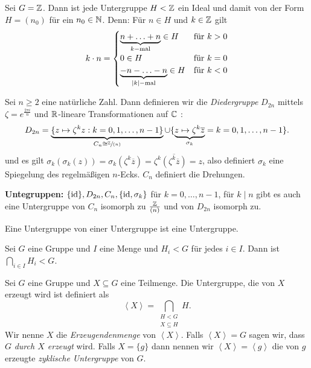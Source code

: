 \begin{eg}
	Sei $G = \mathbb{Z}$. Dann ist jede Untergruppe $H < \mathbb{Z}$ ein Ideal und damit von der Form $H = (n_0)$ für ein $n_0 \in \mathbb{N}$.
	Denn: Für $n \in H$ und $k \in \mathbb{Z}$ gilt 
	\[
		k \cdot n = \begin{cases}
			\underbrace{n + \ldots + n}_{k-\text{mal}} \in H &\text{für } k > 0\\
			0 \in H &\text{für } k = 0\\
			\underbrace{-n - \ldots -n}_{\abs{k}-\text{mal}} \in H &\text{für } k <0
		\end{cases}
	\]
\end{eg}

\begin{eg}
	Sei $n \geq 2$ eine natürliche Zahl.
	Dann definieren wir die \emph{Diedergruppe} $D_{2n}$ mittels $\zeta = e^{\frac{2 \pi i}{n}}$ und $\mathbb{R}$-lineare Transformationen auf $\mathbb{C}$ :
	\[
		D_{2n} = \underbrace{\{z \mapsto \zeta^{k} z : k = 0,1,\ldots,n-1\}}_{C_{n} \cong \sfrac{\mathbb{Z}}{(n)}} \cup 
		\{\underbrace{z \mapsto \zeta^{k} \overline{z}}_{\sigma_{k}} = k = 0,1,\ldots,n-1\} 
	.\] 
	und es gilt $\sigma_{k}(\sigma_{k}(z)) = \sigma_{k}(\zeta^{k} \overline{z}) = \zeta^{k} \overline{(\zeta^{k} \overline{z})} = z$, also definiert $\sigma_{k}$ eine Spiegelung 
	des regelmäßigen $n$-Ecks. $C_{n}$ definiert die Drehungen.

	\textbf{Untegruppen:} $\{\operatorname{id}\}, D_{2n}, C_{n}, \{\operatorname{id}, \sigma_{k}\}$ für $k = 0,\ldots,n-1$, für $k \mid n$ gibt es auch eine Untergruppe von $C_{n}$ isomorph zu $\frac{\mathbb{Z}}{(n)}$ 
	und von $D_{2n}$ isomorph zu. %
\end{eg}

\begin{lemma}
	Eine Untergruppe von einer Untergruppe ist eine Untergruppe.
\end{lemma}

\begin{lemma}
	Sei $G$ eine Gruppe und $I$ eine Menge und $H_{i} < G$ für jedes $i \in I$.
	Dann ist $\bigcap_{i \in I} H_{i} < G$.
\end{lemma}

\begin{definition}
	Sei $G$ eine Gruppe und $X \subseteq G$ eine Teilmenge. Die Untergruppe, die von $X$ erzeugt wird ist definiert als
	\[
		\left< X \right> = \bigcap_{\substack{H < G\\ X \subseteq H}} H
	.\] 
	Wir nenne  $X$ die \emph{Erzeugendenmenge} von $\left< X \right>$. Falls $\left< X \right> = G$ sagen wir, dass $G$ \emph{durch $X$ erzeugt} wird.
	Falls $X = \{g\}$ dann nennen wir $\left< X \right> = \left< g \right>$ die von $g$ erzeugte \emph{zyklische Untergruppe} von $G$. 
\end{definition}

